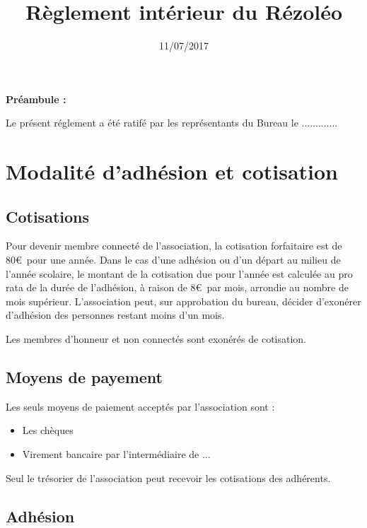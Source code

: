 \documentclass[12pt]{article}
\begin{document}
\title{Règlement intérieur du Rézoléo}
\author{}
\date{11/07/2017}
\maketitle

\textbf{\large{Préambule : \\}}

\noindent Le présent réglement a été ratifé par les représentants du Bureau le .............

\newpage

\tableofcontents

\newpage

\section{Modalité d'adhésion et cotisation}
	\subsection{Cotisations}

		Pour devenir membre connecté de l'association, la cotisation forfaitaire est de 80\euro \ pour une année. Dans le cas d'une adhésion ou d'un départ au milieu de l'année scolaire, le montant de la cotisation due pour l'année est calculée au pro rata de la durée de l'adhésion, à raison de 8\euro \ par mois, arrondie au nombre de mois supérieur. L'association peut, sur approbation du bureau, décider d'exonérer d'adhésion des personnes restant moins d'un mois.

		Les membres d'honneur et non connectés sont exonérés de cotisation.

    \subsection{Moyens de payement}

		Les seuls moyens de paiement acceptés par l'association sont :

			\begin{itemize}
		    	\item[\textbullet] Les chèques
		    	\item[\textbullet] Virement bancaire par l'intermédiaire de ... 
		    \end{itemize}

		Seul le trésorier de l'association peut recevoir les cotisations des adhérents.


    \subsection{Adhésion}
\end{document}
